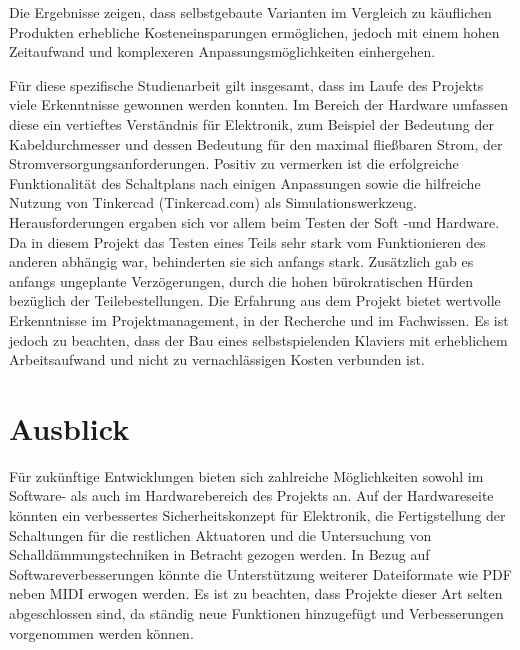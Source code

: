 Die Ergebnisse zeigen, dass selbstgebaute Varianten im Vergleich zu käuflichen Produkten erhebliche Kosteneinsparungen
ermöglichen, jedoch mit einem hohen Zeitaufwand und komplexeren Anpassungsmöglichkeiten einhergehen.

Für diese spezifische Studienarbeit gilt insgesamt, dass im Laufe des Projekts viele Erkenntnisse gewonnen werden konnten.
Im Bereich der Hardware umfassen diese ein vertieftes Verständnis für Elektronik, zum Beispiel der Bedeutung der Kabeldurchmesser
und dessen Bedeutung für den maximal fließbaren Strom, der Stromversorgungsanforderungen.
Positiv zu vermerken ist die erfolgreiche Funktionalität des Schaltplans nach einigen Anpassungen sowie die hilfreiche
Nutzung von Tinkercad (Tinkercad.com) als Simulationswerkzeug.
Herausforderungen ergaben sich vor allem beim Testen der Soft -und Hardware.
Da in diesem Projekt das Testen eines Teils sehr stark vom Funktionieren des anderen abhängig war,
behinderten sie sich anfangs stark.
Zusätzlich gab es anfangs ungeplante Verzögerungen, durch die hohen bürokratischen Hürden bezüglich der Teilebestellungen.
Die Erfahrung aus dem Projekt bietet wertvolle Erkenntnisse im Projektmanagement, in der Recherche und im Fachwissen.
Es ist jedoch zu beachten, dass der Bau eines selbstspielenden Klaviers mit erheblichem Arbeitsaufwand und nicht zu
vernachlässigen Kosten verbunden ist.

\section{Ausblick}

Für zukünftige Entwicklungen bieten sich zahlreiche Möglichkeiten sowohl im Software- als auch im Hardwarebereich des Projekts an.
Auf der Hardwareseite könnten ein verbessertes Sicherheitskonzept für Elektronik, die Fertigstellung der Schaltungen für die
restlichen Aktuatoren und die Untersuchung von Schalldämmungstechniken in Betracht gezogen werden.
In Bezug auf Softwareverbesserungen könnte die Unterstützung weiterer Dateiformate wie PDF neben MIDI erwogen werden.
Es ist zu beachten, dass Projekte dieser Art selten abgeschlossen sind, da ständig neue Funktionen hinzugefügt und
Verbesserungen vorgenommen werden können.

